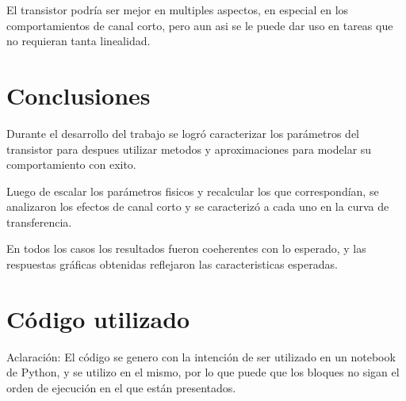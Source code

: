 \documentclass[a4paper, twoside, 10pt, spanish]{article}
\numberwithin{table}{section}
\begin{document}
	El transistor podría ser mejor en multiples aspectos, en especial en los comportamientos de canal corto, pero aun asi se le puede dar uso en tareas que no requieran tanta linealidad. 



\section{Conclusiones}

Durante el desarrollo del trabajo se logró caracterizar los parámetros del transistor para despues utilizar metodos y aproximaciones para modelar su comportamiento con exito. 

Luego de escalar los parámetros fisicos y recalcular los que correspondían, se analizaron los efectos de canal corto y se caracterizó a cada uno en la curva de transferencia. 

En todos los casos los resultados fueron coeherentes con lo esperado, y las respuestas gráficas obtenidas reflejaron las caracteristicas esperadas.

\pagebreak

\appendix

\section{Código utilizado}

Aclaración: El código se genero con la intención de ser utilizado en un notebook de Python, y se utilizo en el mismo, por lo que puede que los bloques no sigan el orden de ejecución en el que están presentados.
\end{document}

